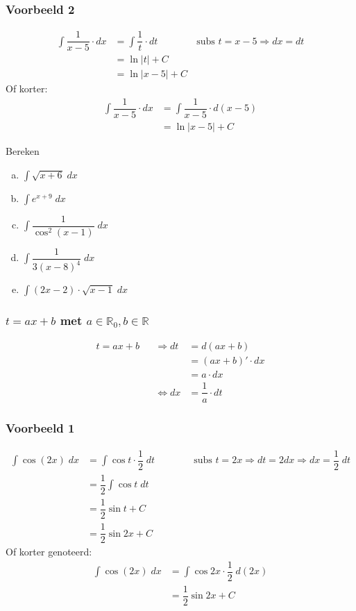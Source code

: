 \documentclass[a4paper,12pt, twoside]{article}
\begin{document}
\vspace{-1cm}
\subsubsection*{Voorbeeld 2}
\begin{align*}
  \int \dfrac{1}{x-5} \cdot dx &= \int \dfrac{1}{t} \cdot dt \qquad\qquad\mbox{subs }t=x-5 \Rightarrow dx = dt\\
  &= \ln|t| + C\\
  &= \ln|x-5| + C
\end{align*}
Of korter:
\begin{align*}
  \int \dfrac{1}{x-5} \cdot dx &= \int \dfrac{1}{x-5} \cdot d(x-5)\\
  &= \ln|x-5| + C
\end{align*}

\begin{oefening}
  Bereken
  \begin{multicols}{2}
  \begin{enumerate}[(a)]
  \item $\displaystyle\int \sqrt{x+6} \;dx$
  \item $\displaystyle\int e^{x+9} \;dx$
  \item $\displaystyle\int \dfrac{1}{\cos^2(x-1)} \;dx$
  \item $\displaystyle\int \dfrac{1}{3(x-8)^4} \;dx$
  \item $\displaystyle\int (2x-2)\cdot\sqrt{x-1} \;dx$
  \end{enumerate}
\end{multicols}
\end{oefening}

\subsubsection{$t=ax+b$ met $a\in\mathbb{R}_0, b\in\mathbb{R}$}

\begin{alignat*}{2}
  t = ax+b &&\Rightarrow dt &= d(ax+b)\\ && &= (ax+b)'\cdot dx \\ && &= a \cdot dx\\
           &&\Leftrightarrow dx &= \dfrac{1}{a} \cdot dt
\end{alignat*}

\subsubsection*{Voorbeeld 1}
\begin{align*}
  \int \cos(2x) \;dx
  &= \int \cos t \cdot \dfrac{1}{2} \;dt \qquad\qquad\mbox{subs }t=2x \Rightarrow dt = 2dx \Rightarrow dx = \dfrac{1}{2} \;dt\\
  &= \dfrac{1}{2} \int \cos t \;dt\\
  &= \dfrac{1}{2} \sin t + C\\
  &= \dfrac{1}{2} \sin 2x + C
\end{align*}
Of korter genoteerd:
\begin{align*}
  \int \cos(2x) \;dx &= \int \cos 2x \cdot \dfrac{1}{2} \;d(2x)\\
  &= \dfrac{1}{2} \sin 2x + C
\end{align*}
\end{document}
